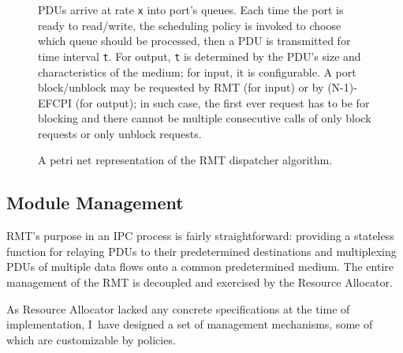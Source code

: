             \begin{figure}[H]
                \begin{center}
                    \caption{A petri net representation of the RMT dispatcher algorithm.}
                    \label{fig:sched-petri}
                    \medskip
                    \small
                    PDUs arrive at rate \texttt{x} into port's queues. Each time the port is ready to read/write, the scheduling policy is invoked to choose which queue should be processed, then a PDU is transmitted for time interval \texttt{t}. For output, \texttt{t} is determined by the PDU's size and characteristics of the medium; for input, it is configurable. A port block/unblock may be requested by RMT (for input) or by (N-1)-EFCPI (for output); in such case, the first ever request has to be for blocking and there cannot be multiple consecutive calls of only block requests or only unblock requests.
                \end{center}
            \end{figure}

        \subsection{Module Management}\label{implementation:mgmt}

            RMT's purpose in an IPC process is fairly straightforward: providing a stateless function for relaying PDUs to their predetermined destinations and multiplexing PDUs of multiple data flows onto a common predetermined medium. The entire management of the RMT is decoupled and exercised by the Resource Allocator.

            As Resource Allocator lacked any concrete specifications at the time of implementation, I~have designed a set of management mechanisms, some of which are customizable by policies.

